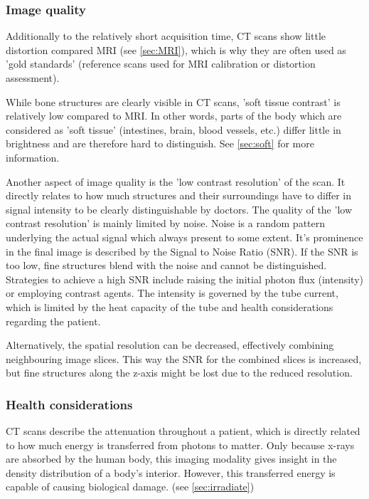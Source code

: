 \subsubsection{Image quality} %
Additionally to the relatively short acquisition time, CT scans show little distortion compared MRI (see \ref{sec:MRI}), which is why they are often used as 'gold standards' (reference scans used for MRI calibration or distortion assessment).

While bone structures are clearly visible in CT scans, 'soft tissue contrast' is relatively low compared to MRI.
In other words, parts of the body which are considered as 'soft tissue' (intestines, brain, blood vessels, etc.) differ little in brightness and are therefore hard to distinguish.
See \ref{sec:soft} for more information.

Another aspect of image quality is the 'low contrast resolution' of the scan.
It directly relates to how much structures and their surroundings have to differ in signal intensity to be clearly distinguishable by doctors.
The quality of the 'low contrast resolution' is mainly limited by noise.
Noise is a random pattern underlying the actual signal which always present to some extent.
It's prominence in the final image is described by the Signal to Noise Ratio (SNR).
If the SNR is too low, fine structures blend with the noise and cannot be distinguished. 
Strategies to achieve a high SNR include raising the initial photon flux (intensity) or employing contrast agents.
The intensity is governed by the tube current, which is limited by the heat capacity of the tube and health considerations regarding the patient.

Alternatively, the spatial resolution can be decreased, effectively combining neighbouring image slices.
This way the SNR for the combined slices is increased, but fine structures along the z-axis might be lost due to the reduced resolution. \cite{Podgorsak, Maidment2014}

\subsubsection{Health considerations}
CT scans describe the attenuation throughout a patient, which is directly related to how much energy is transferred from photons to matter.
Only because x-rays are absorbed by the human body, this imaging modality gives insight in the density distribution of a body's interior.
However, this transferred energy is capable of causing biological damage. (see \ref{sec:irradiate})

